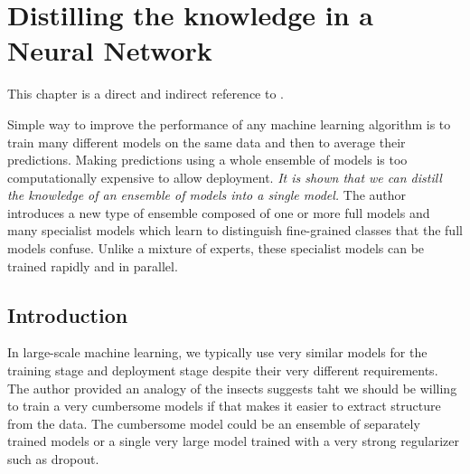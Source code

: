 \chapter{Distilling the knowledge in a Neural Network}
This chapter is a direct and indirect reference to \cite{hinton2015distilling}.

Simple way to improve the performance of any machine learning algorithm is to train many different models on the same data and then to average their predictions. Making predictions using a whole ensemble of models is too computationally expensive to allow deployment. \textit{It is shown that we can distill the knowledge of an ensemble of models into a single model.} The author introduces a new type of ensemble composed of one or more full models and many specialist models which learn to distinguish fine-grained classes that the full models confuse. Unlike a mixture of experts, these specialist models can be trained rapidly and in parallel. 

\section{Introduction}

In large-scale machine learning, we typically use very similar models for the training stage and deployment stage despite their very different requirements. The author provided an analogy of the insects suggests taht we should be willing to train a very cumbersome models if that makes it easier to extract structure from the data. The cumbersome model could be an ensemble of separately trained models or a single very large model trained with a very strong regularizer such as dropout. 